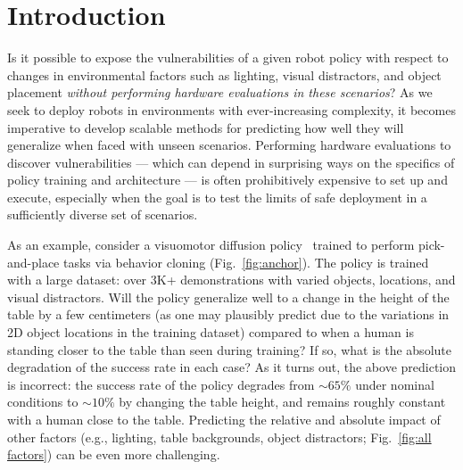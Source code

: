 \section{Introduction}
\label{sec:intro}

Is it possible to expose the vulnerabilities of a given robot policy with respect to changes in environmental factors such as lighting, visual distractors, and object placement \emph{without performing hardware evaluations in these scenarios}? As we seek to deploy robots in environments with ever-increasing complexity, it becomes imperative to develop scalable methods for predicting how well they will generalize when faced with unseen scenarios. Performing hardware evaluations to discover vulnerabilities --- which can depend in surprising ways on the specifics of policy training and architecture --- is often prohibitively expensive to set up and execute, especially when the goal is to test the limits of safe deployment in a sufficiently diverse set of scenarios. 

As an example, consider a visuomotor diffusion policy~\cite{chi2023diffusion} trained to perform pick-and-place tasks via behavior cloning (Fig.~\ref{fig:anchor}). The policy is trained with a large dataset: over 3K+ demonstrations with varied objects, locations, and visual distractors. Will the policy generalize well to a change in the height of the table by a few centimeters (as one may plausibly predict due to the variations in 2D object locations in the training dataset) compared to when a human is standing closer to the table than seen during training? If so, what is the absolute degradation of the success rate in each case? As it turns out, the above prediction is incorrect: the success rate of the policy degrades from $\sim65\%$ under nominal conditions to $\sim10\%$ by changing the table height, and remains roughly constant with a human close to the table. Predicting the relative and absolute impact of other factors (e.g., lighting, table backgrounds, object distractors; Fig.~\ref{fig:all factors}) can be even more challenging.

